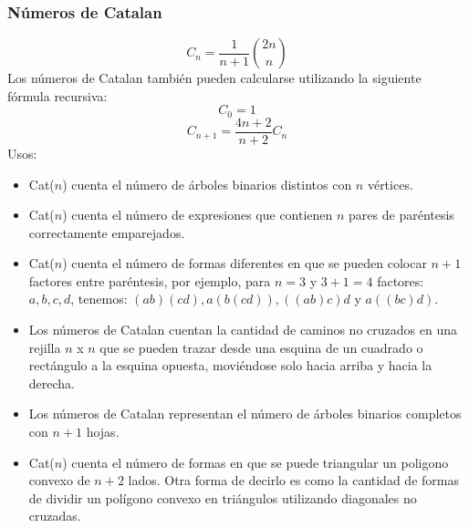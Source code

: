 \subsubsection{Números de Catalan}
\[ C_n = \frac{1}{n+1} \binom{2n}{n} \]
Los números de Catalan también pueden calcularse utilizando la siguiente fórmula recursiva:
\[ C_0 = 1 \]
\[ C_{n+1} = \frac{4n+2}{n+2} C_n \]
Usos:
\begin{itemize}
    \item  Cat($n$) cuenta el número de árboles binarios distintos con $n$ vértices.

    \item  Cat($n$) cuenta el número de expresiones que contienen $n$ pares de paréntesis correctamente emparejados.

    \item  Cat($n$) cuenta el número de formas diferentes en que se pueden colocar $n+1$ factores entre paréntesis, por ejemplo, para $n=3$ y $3+1=4$ factores: ${a, b, c, d}$, tenemos: $(ab)(cd), a(b(cd)), ((ab)c)d$ y $a((bc)d)$.
    
    \item  Los números de Catalan cuentan la cantidad de caminos no cruzados en una rejilla $n$ x $n$ que se pueden trazar desde una esquina de un cuadrado o rectángulo a la esquina opuesta, moviéndose solo hacia arriba y hacia la derecha.
    
    \item  Los números de Catalan representan el número de árboles binarios completos con $n+1$ hojas.
    
    \item  Cat($n$) cuenta el número de formas en que se puede triangular un poligono convexo de $n+2$ lados. Otra forma de decirlo es como la cantidad de formas de dividir un polígono convexo en triángulos utilizando diagonales no cruzadas.
    
\end{itemize}
